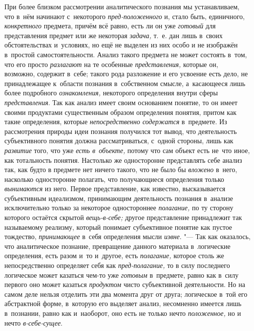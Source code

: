 При более близком рассмотрении аналитического познания мы
устанавливаем, что в~нём начинают с~некоторого
{\em пред-положенного}
и, стало быть, единичного,
{\em конкретного}
предмета, причём всё равно, есть ли он уже
{\em готовый} для
представления предмет или же некоторая
{\em задача,} т.~е. дан
лишь в~своих обстоятельствах и~условиях, но ещё не выделен из них особо и
не изображён в~простой самостоятельности. Анализ такого предмета не может
состоять в~том, что его просто
{\em разлагают} на те
особенные {\em представления,}
которые он, возможно, содержит в~себе; такого рода разложение
и его усвоение есть дело, не принадлежащее к~области познания в~собственном
смысле, а~касающееся лишь более подробного
{\em ознакомления,}
некоторого определения внутри сферы
{\em представления}. Так
как анализ имеет своим основанием понятие, то он имеет своими продуктами
существенным образом определения понятия, притом как такие определения,
которые {\em непосредственно
содержатся} в~предмете. Из рассмотрения природы идеи
познания получился тот вывод, что деятельность субъективного понятия должна
рассматриваться, с~одной стороны, лишь как
{\em развитие} того, что
уже {\em есть в~объекте,}
потому что сам объект есть не~что иное, как тотальность
понятия. Настолько же односторонне представлять себе анализ так, как будто
в предмете нет ничего такого, что не было бы
{\em вложено} в~него,
насколько односторонне полагать, что получающиеся определения
только {\em вынимаются}
из него. Первое представление, как известно, высказывается
субъективным идеализмом, принимающим деятельность познания в~анализе
исключительно только за некоторое одностороннее
{\em полагание,} по ту
сторону которого остаётся скрытой
{\em вещь-в-себе;} другое
представление принадлежит так называемому реализму, который понимает
субъективное понятие как пустое тождество,
{\em принимающее} в~себя
определения мысли {\em извне}. "---
Так как оказалось, что аналитическое познание, превращение
данного материала в~логические определения, есть разом и~то и~другое, есть
{\em полагание,} которое
столь же непосредственно определяет себя как
{\em пред-полагание,} то
в силу последнего логическое может казаться чем-то уже
{\em готовым} в~предмете,
равно как в~силу первого оно может казаться
{\em продуктом} чисто
субъективной деятельности. Но на самом деле нельзя отделить эти два момента
друг от друга; логическое в~той его абстрактной форме, в~которую его
выделяет анализ, несомненно имеется лишь в~познании, равно как и~наоборот,
оно есть не только нечто
{\em положенное,} но и
нечто {\em в-себе-сущее}.

